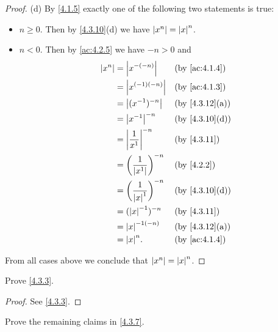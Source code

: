 \begin{proof}{(d)}
  By \cref{4.1.5} exactly one of the following two statements is true:
  \begin{itemize}
    \item \(n \geq 0\).
          Then by \cref{4.3.10}(d) we have \(\left\lvert x^n\right\rvert = \left\lvert x\right\rvert^n\).
    \item \(n < 0\).
          Then by \cref{ac:4.2.5} we have \(-n > 0\) and
          \begin{align*}
            \abs{x^n} & = \abs{x^{-(-n)}}                       &  & \by{ac:4.1.4}                \\
                      & = \abs{x^{(-1)(-n)}}                    &  & \by{ac:4.1.3}                \\
                      & = \abs{(x^{-1})^{-n}}                   &  & \text{(by \cref{4.3.12}(a))} \\
                      & = \abs{x^{-1}}^{-n}                     &  & \text{(by \cref{4.3.10}(d))} \\
                      & = \abs{\dfrac{1}{x^1}}^{-n}             &  & \by{4.3.11}                  \\
                      & = \bigg(\dfrac{1}{\abs{x^1}}\bigg)^{-n} &  & \by{4.2.2}                   \\
                      & = \bigg(\dfrac{1}{\abs{x}^1}\bigg)^{-n} &  & \text{(by \cref{4.3.10}(d))} \\
                      & = (\abs{x}^{-1})^{-n}                   &  & \by{4.3.11}                  \\
                      & = \abs{x}^{-1(-n)}                      &  & \text{(by \cref{4.3.12}(a))} \\
                      & = \abs{x}^n.                            &  & \by{ac:4.1.4}
          \end{align*}
  \end{itemize}
  From all cases above we conclude that \(\left\lvert x^n\right\rvert = \left\lvert x\right\rvert^n\).
\end{proof}

\exercisesection

\begin{ex}\label{ex:4.3.1}
  Prove \cref{4.3.3}.
\end{ex}

\begin{proof}
  See \cref{4.3.3}.
\end{proof}

\begin{ex}\label{ex:4.3.2}
  Prove the remaining claims in \cref{4.3.7}.
\end{ex}

